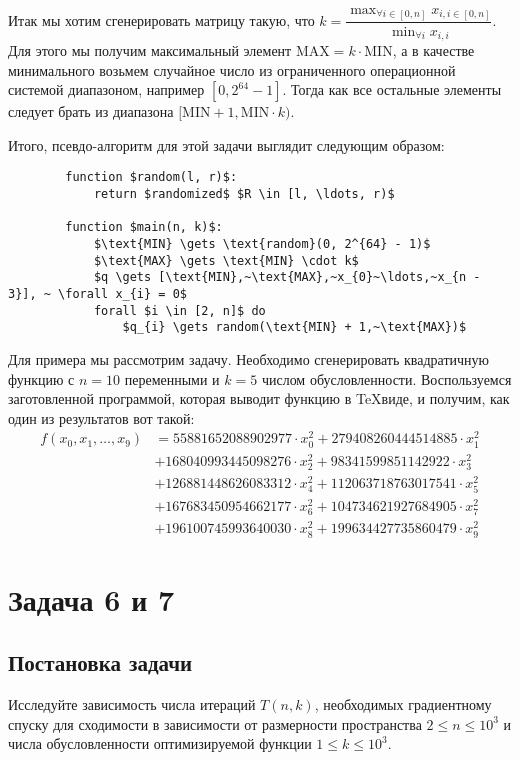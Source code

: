 \documentclass[12pt, a4paper, oneside]{article}
\begin{document}
	Итак мы хотим сгенерировать матрицу такую, что $k = \dfrac{\max_{\forall i \in [0, n]}{x_{i, i \in [0, n]}}}{\min_{\forall i}{x_{i, i}}}$. Для этого мы получим максимальный элемент $\text{MAX} = k \cdot \text{MIN}$, а в качестве минимального возьмем случайное число из ограниченного операционной системой диапазоном, например $[0, 2^{64} - 1]$. Тогда как все остальные элементы следует брать из диапазона $[\text{MIN} + 1, \text{MIN} \cdot k)$.

	Итого, псевдо-алгоритм для этой задачи выглядит следующим образом:
	\begin{lstlisting}
		function $random(l, r)$:
			return $randomized$ $R \in [l, \ldots, r)$
		
		function $main(n, k)$:
			$\text{MIN} \gets \text{random}(0, 2^{64} - 1)$
			$\text{MAX} \gets \text{MIN} \cdot k$
			$q \gets [\text{MIN},~\text{MAX},~x_{0}~\ldots,~x_{n - 3}], ~ \forall x_{i} = 0$
			forall $i \in [2, n]$ do
				$q_{i} \gets random(\text{MIN} + 1,~\text{MAX})$
	\end{lstlisting}
	Для примера мы рассмотрим задачу. Необходимо сгенерировать квадратичную функцию с $n = 10$ переменными и $k = 5$ числом обусловленности. Воспользуемся заготовленной программой, которая выводит функцию в \TeX виде, и получим, как один из результатов вот такой:
	\begin{align*}
		f(x_0, x_1, \ldots, x_9) &= 55881652088902977 \cdot x^2_0 + 279408260444514885 \cdot x^2_1 \\
		&+ 168040993445098276 \cdot x^2_2 + 98341599851142922 \cdot x^2_3 \\
		&+ 126881448626083312 \cdot x^2_4 + 112063718763017541 \cdot x^2_5 \\
		&+ 167683450954662177 \cdot x^2_6 + 104734621927684905 \cdot x^2_7 \\
		&+ 196100745993640030 \cdot x^2_8 + 199634427735860479 \cdot x^2_9
	\end{align*}
	\section*{Задача 6 и 7}
	\subsection*{Постановка задачи}
	Исследуйте зависимость числа итераций $T(n, k)$, необходимых градиентному спуску для сходимости в зависимости от размерности пространства $2 \leqslant n \leqslant 10^{3}$ и числа обусловленности оптимизируемой функции $1 \leqslant k \leqslant 10^{3}$.
\end{document}
